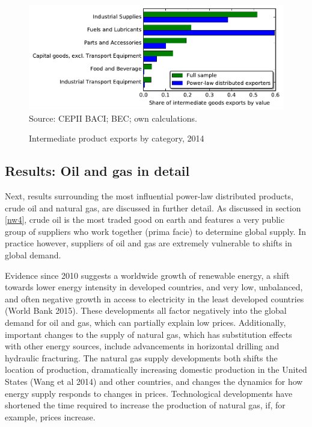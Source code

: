 \documentclass[10pt,letterpaper,pdftex]{article}
\begin{document}
\begin{figure}
  \caption{Intermediate product exports by category, 2014}
  \centering
\includegraphics[scale=0.7]{plots/bec_cat.pdf} \\
\footnotesize{Source: CEPII BACI; BEC; own calculations.}\\
\end{figure}

\subsection{Results: Oil and gas in detail} \label{results_oil_gas_detail}
Next, results surrounding the most influential power-law distributed products, crude oil and natural gas, are discussed in further detail. As discussed in section \ref{nw4}, crude oil is the most traded good on earth and features a very public group of suppliers who work together (prima facie) to determine global supply. In practice however, suppliers of oil and gas are extremely vulnerable to shifts in global demand. 

Evidence since 2010 suggests a worldwide growth of renewable energy, a shift towards lower energy intensity in developed countries, and very low, unbalanced, and often negative growth in access to electricity in the least developed countries (World Bank 2015). These developments all factor negatively into the global demand for oil and gas, which can partially explain low prices. Additionally, important changes to the supply of natural gas, which has substitution effects with other energy sources, include advancements in horizontal drilling and hydraulic fracturing. The natural gas supply developments both shifts the location of production, dramatically increasing domestic production in the United States (Wang et al 2014) and other countries, and changes the dynamics for how energy supply responds to changes in prices. Technological developments have shortened the time required to increase the production of natural gas, if, for example, prices increase.
\end{document}
